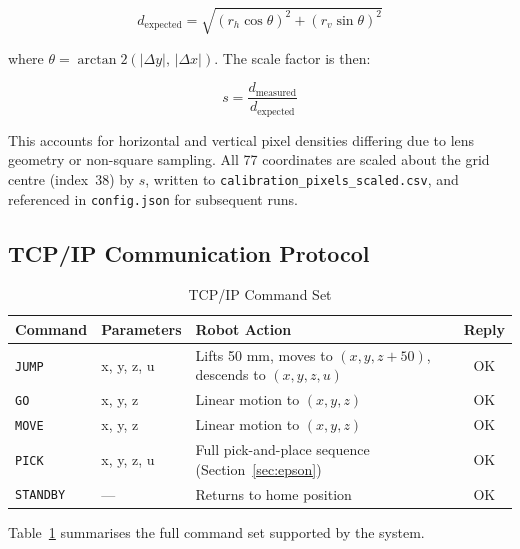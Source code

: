 \documentclass[11pt,conference]{IEEEtran}
\begin{document}
\begin{equation}
  d_{\mathrm{expected}} = \sqrt{\left(r_h \cos\theta\right)^2 + \left(r_v \sin\theta\right)^2}
  \label{eq:expected_dist}
\end{equation}

where $\theta = \arctan2(|\Delta y|,\, |\Delta x|)$. The scale factor is then:

\begin{equation}
  s = \frac{d_{\mathrm{measured}}}{d_{\mathrm{expected}}}
  \label{eq:scale_factor}
\end{equation}

This accounts for horizontal and vertical pixel densities differing due to lens geometry or non-square sampling. All 77 coordinates are scaled about the grid centre (index~38) by $s$, written to \texttt{calibration\_pixels\_scaled.csv}, and referenced in \texttt{config.json} for subsequent runs.

\subsection{TCP/IP Communication Protocol}

\begin{table}[t]
  \caption{TCP/IP Command Set}
  \label{tab:commands}
  \centering
  \begin{tabular}{@{}llp{4.2cm}c@{}}
    \toprule
    \textbf{Command} & \textbf{Parameters} & \textbf{Robot Action} & \textbf{Reply} \\
    \midrule
    \texttt{JUMP}    & x, y, z, u & Lifts 50 mm, moves to $(x, y, z{+}50)$, descends to $(x, y, z, u)$ & OK \\
    \texttt{GO}      & x, y, z    & Linear motion to $(x, y, z)$                                      & OK \\
    \texttt{MOVE}    & x, y, z    & Linear motion to $(x, y, z)$                                      & OK \\
    \texttt{PICK}    & x, y, z, u & Full pick-and-place sequence (Section~\ref{sec:epson})             & OK \\
    \texttt{STANDBY} & ---        & Returns to home position                                           & OK \\
    \bottomrule
  \end{tabular}
\end{table}

Table~\ref{tab:commands} summarises the full command set supported by the system.
\end{document}
